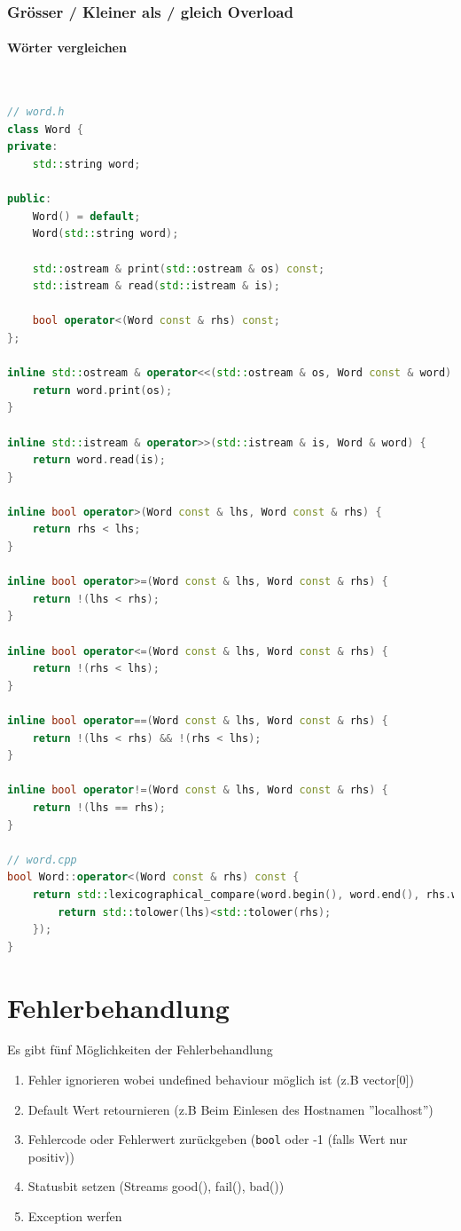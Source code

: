 \clearpage

\subsubsection{Grösser / Kleiner als / gleich Overload}
\paragraph{Wörter vergleichen} \hfill \\
\begin{lstlisting}[language=C++]
// word.h
class Word {
private:
	std::string word;

public:
	Word() = default;
	Word(std::string word);

	std::ostream & print(std::ostream & os) const;
	std::istream & read(std::istream & is);

	bool operator<(Word const & rhs) const;
};

inline std::ostream & operator<<(std::ostream & os, Word const & word) {
	return word.print(os);
}

inline std::istream & operator>>(std::istream & is, Word & word) {
	return word.read(is);
}

inline bool operator>(Word const & lhs, Word const & rhs) {
	return rhs < lhs;
}

inline bool operator>=(Word const & lhs, Word const & rhs) {
	return !(lhs < rhs);
}

inline bool operator<=(Word const & lhs, Word const & rhs) {
	return !(rhs < lhs);
}

inline bool operator==(Word const & lhs, Word const & rhs) {
	return !(lhs < rhs) && !(rhs < lhs);
}

inline bool operator!=(Word const & lhs, Word const & rhs) {
	return !(lhs == rhs);
}

// word.cpp
bool Word::operator<(Word const & rhs) const {
	return std::lexicographical_compare(word.begin(), word.end(), rhs.word.begin() ,rhs.word.end(), [](char lhs, char rhs) {
		return std::tolower(lhs)<std::tolower(rhs);
	});
}
\end{lstlisting}

\section{Fehlerbehandlung}
Es gibt fünf Möglichkeiten der Fehlerbehandlung
\begin{enumerate}
	\item Fehler ignorieren wobei undefined behaviour möglich ist (z.B vector[0])
	\item Default Wert retournieren (z.B Beim Einlesen des Hostnamen ''localhost'')
	\item Fehlercode oder Fehlerwert zurückgeben (\lstinline|bool| oder -1 (falls Wert nur positiv))
	\item Statusbit setzen (Streams good(), fail(), bad())
	\item Exception werfen	
\end{enumerate}


